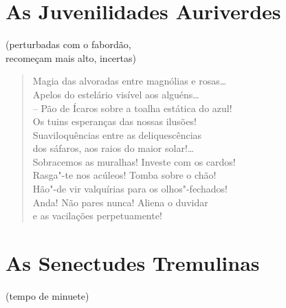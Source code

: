 \medskip
\section*{As Juvenilidades Auriverdes}

\begin{flushright}
{\small(perturbadas com o fabordão,\\
recomeçam mais alto, incertas)}
\end{flushright}

\begin{verse}
Magia das alvoradas entre magnólias e rosas\ldots{}\\
Apelos do estelário visível aos alguéns\ldots{}\\
-- Pão de Ícaros sobre a toalha estática do azul!\\
Os tuins esperanças das nossas ilusões!\\
Suaviloquências entre as deliquescências\\
dos sáfaros, aos raios do maior solar!\ldots{}\\
Sobracemos as muralhas! Investe com os cardos!\\
Rasga"-te nos acúleos! Tomba sobre o chão!\\
Hão"-de vir valquírias para os olhos"-fechados!\\
Anda! Não pares nunca! Aliena o duvidar\\
e as vacilações perpetuamente!
\end{verse}

\medskip
\section*{As Senectudes Tremulinas}

\begin{flushright}
{\small(tempo de minuete)}
\end{flushright}

